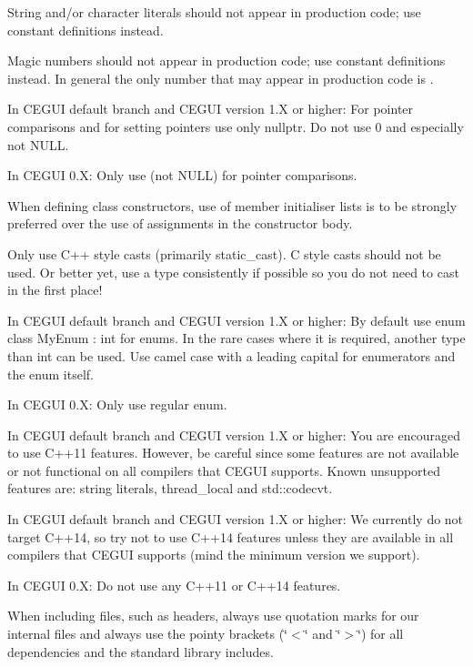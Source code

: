 \begin{DoxyItemize}
\item String and/or character literals should not appear in production code; use constant definitions instead.
\item Magic numbers should not appear in production code; use constant definitions instead. In general the only number that may appear in production code is {}.
\item In C\+E\+G\+UI default branch and C\+E\+G\+UI version 1.\+X or higher\+: For pointer comparisons and for setting pointers use only {\ttfamily nullptr}. Do not use 0 and especially not N\+U\+LL.
\item In C\+E\+G\+UI 0.\+X\+: Only use {} (not {\ttfamily N\+U\+LL}) for pointer comparisons.
\item When defining class constructors, use of member initialiser lists is to be strongly preferred over the use of assignments in the constructor body.
\item Only use C++ style casts (primarily static\+\_\+cast). C style casts should not be used. Or better yet, use a type consistently if possible so you do not need to cast in the first place!
\item In C\+E\+G\+UI default branch and C\+E\+G\+UI version 1.\+X or higher\+: By default use {\ttfamily enum class My\+Enum \+: int} for enums. In the rare cases where it is required, another type than int can be used. Use camel case with a leading capital for enumerators and the enum itself.
\item In C\+E\+G\+UI 0.\+X\+: Only use regular {\ttfamily enum}.
\item In C\+E\+G\+UI default branch and C\+E\+G\+UI version 1.\+X or higher\+: You are encouraged to use C++11 features. However, be careful since some features are not available or not functional on all compilers that C\+E\+G\+UI supports. Known unsupported features are\+: string literals, thread\+\_\+local and std\+::codecvt.
\item In C\+E\+G\+UI default branch and C\+E\+G\+UI version 1.\+X or higher\+: We currently do not target C++14, so try not to use C++14 features unless they are available in all compilers that C\+E\+G\+UI supports (mind the minimum version we support).
\item In C\+E\+G\+UI 0.\+X\+: Do not use any C++11 or C++14 features.
\item When including files, such as headers, always use quotation marks for our internal files and always use the pointy brackets (\char`\"{}$<$\char`\"{} and \char`\"{}$>$\char`\"{}) for all dependencies and the standard library includes. 
\begin{DoxyCode}{0}
\DoxyCodeLine{\textcolor{preprocessor}{\#include "CEGUI/SomeClass.h"}}
\DoxyCodeLine{}
\DoxyCodeLine{\textcolor{preprocessor}{\#include <freetype.h>}}
\DoxyCodeLine{\textcolor{preprocessor}{\#include <vector>}}
\end{DoxyCode}


\end{DoxyItemize}
